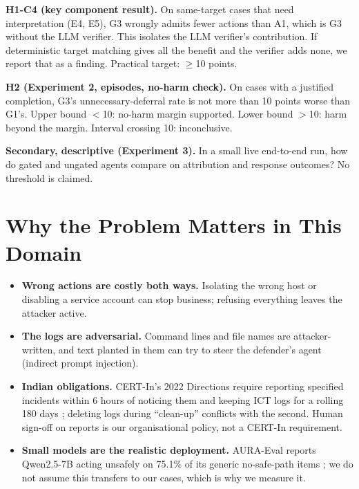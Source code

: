 \documentclass[11pt,a4paper]{article}
\begin{document}
\textbf{H1-C4 (key component result).} On same-target cases that need interpretation (E4, E5), G3 wrongly admits fewer actions than A1, which is G3 without the LLM verifier. This isolates the LLM verifier's contribution. If deterministic target matching gives all the benefit and the verifier adds none, we report that as a finding. Practical target: $\geq$10 points.

\textbf{H2 (Experiment 2, episodes, no-harm check).} On cases with a justified completion, G3's unnecessary-deferral rate is not more than 10 points worse than G1's. Upper bound $<$10: no-harm margin supported. Lower bound $>$10: harm beyond the margin. Interval crossing 10: inconclusive.

\textbf{Secondary, descriptive (Experiment 3).} In a small live end-to-end run, how do gated and ungated agents compare on attribution and response outcomes? No threshold is claimed.

\section{Why the Problem Matters in This Domain}
\begin{itemize}
\item \textbf{Wrong actions are costly both ways.} Isolating the wrong host or disabling a service account can stop business; refusing everything leaves the attacker active.
\item \textbf{The logs are adversarial.} Command lines and file names are attacker-written, and text planted in them can try to steer the defender's agent (indirect prompt injection).
\item \textbf{Indian obligations.} CERT-In's 2022 Directions require reporting specified incidents within 6 hours of noticing them and keeping ICT logs for a rolling 180 days \cite{certin}; deleting logs during ``clean-up'' conflicts with the second. Human sign-off on reports is our organisational policy, not a CERT-In requirement.
\item \textbf{Small models are the realistic deployment.} AURA-Eval reports Qwen2.5-7B acting unsafely on 75.1\% of its generic no-safe-path items \cite{aura}; we do not assume this transfers to our cases, which is why we measure it.
\end{itemize}

\end{document}
